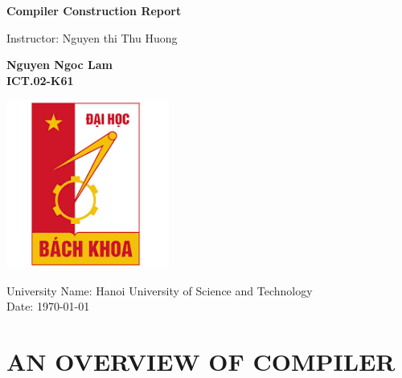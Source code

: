 \documentclass[12pt, a4paper]{report}
\begin{document}
	\begin{titlepage}
		\begin{center}
       		\vspace*{1cm}
 			
 			\Huge
       		\textbf{Compiler Construction Report}
 
       		\vspace{0.5cm}Instructor: Nguyen thi Thu Huong
 
       		\vspace{1.5cm}
 
       		\textbf{Nguyen Ngoc Lam \\ICT.02-K61 }
 
       		\vfill
 
 			
 			\includegraphics[width=0.4\textwidth]{university.png}      		
 			\normalsize
       		\vspace{0.8cm}
 
      		
 
       		University Name: Hanoi University of Science and Technology\\
       		Date: \today
 
   		\end{center}
	\end{titlepage}
	\tableofcontents
	\newpage
	\chapter{AN OVERVIEW OF COMPILER}
	\newpage
\end{document}
